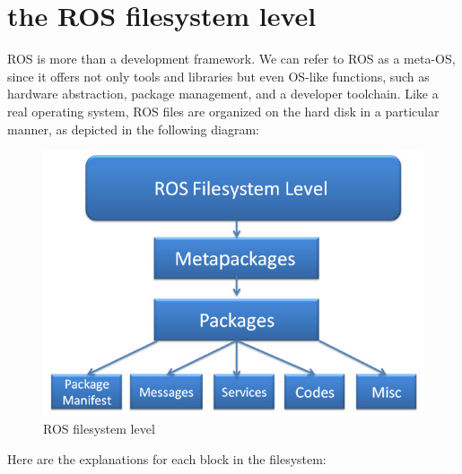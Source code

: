 \documentclass[../../main]{subfiles}
\begin{document}
\section{the ROS filesystem level}
ROS is more than a development framework. We can refer to ROS as a meta-OS, since
it offers not only tools and libraries but even OS-like functions, such as hardware
abstraction, package management, and a developer toolchain. Like a real operating
system, ROS files are organized on the hard disk in a particular manner, as depicted in the
following diagram:
\begin{figure}[ht]
    \centering
    \includegraphics{img/filesystem.jpg}
    \caption{ROS filesystem level}
\end{figure}
Here are the explanations for each block in the filesystem:
\end{document}
